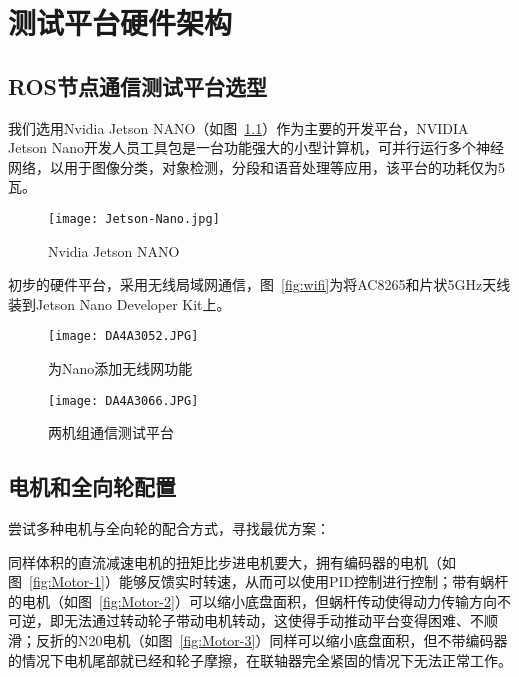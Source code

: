 \chapter{测试平台硬件架构}
\label{cha:Hardware}

\section{ROS节点通信测试平台选型}

我们选用Nvidia Jetson NANO（如图~\ref{fig:Jetson-Nano}）作为主要的开发平台，NVIDIA Jetson Nano开发人员工具包是一台功能强大的小型计算机，可并行运行多个神经网络，以用于图像分类，对象检测，分段和语音处理等应用，该平台的功耗仅为5瓦。

\begin{figure}[htbp] %
    \centering
    \texttt{[image: Jetson-Nano.jpg]}
    \caption{Nvidia Jetson NANO}
    \label{fig:Jetson-Nano}
\end{figure}

初步的硬件平台，采用无线局域网通信，图~\ref{fig:wifi}为将AC8265和片状5GHz天线装到Jetson Nano Developer Kit上。

\begin{figure}[htbp]
    \begin{minipage}{0.48\textwidth}
      \centering
      \texttt{[image: DA4A3052.JPG]}
      \caption{为Nano添加无线网功能}
      \label{fig:wifi}
    \end{minipage}\hfill
    \begin{minipage}{0.48\textwidth}
      \centering
      \texttt{[image: DA4A3066.JPG]}
      \caption{两机组通信测试平台}
      \label{fig:two-setup}
    \end{minipage}
\end{figure}


\section{电机和全向轮配置}

尝试多种电机与全向轮的配合方式，寻找最优方案：

同样体积的直流减速电机的扭矩比步进电机要大，拥有编码器的电机（如图~\ref{fig:Motor-1}）能够反馈实时转速，从而可以使用PID控制进行控制；带有蜗杆的电机（如图~\ref{fig:Motor-2}）可以缩小底盘面积，但蜗杆传动使得动力传输方向不可逆，即无法通过转动轮子带动电机转动，这使得手动推动平台变得困难、不顺滑；反折的N20电机（如图~\ref{fig:Motor-3}）同样可以缩小底盘面积，但不带编码器的情况下电机尾部就已经和轮子摩擦，在联轴器完全紧固的情况下无法正常工作。

